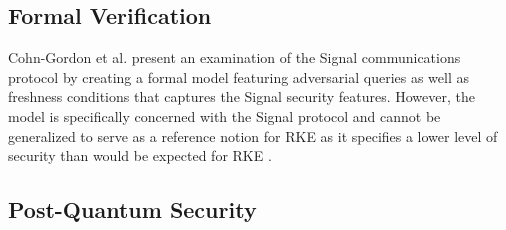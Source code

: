 \subsection{Formal Verification}
Cohn-Gordon et al. \cite{cohn2020formal} present an examination of the Signal communications protocol by creating a formal model featuring adversarial queries as well as freshness conditions that captures the Signal security features. However, the model is specifically concerned with the Signal protocol and cannot be generalized to serve as a reference notion for RKE as it specifies a lower level of security than would be expected for RKE \cite{poettering2018asynchronous}.

\subsection{Post-Quantum Security}
